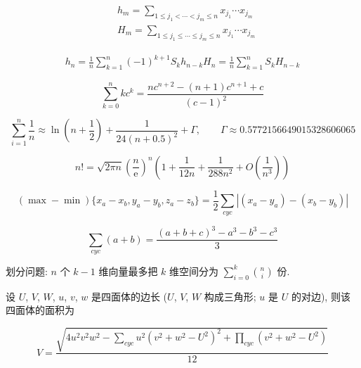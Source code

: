 \begin{eqnarray}
    &h_m = \sum_{1\leq j_1 < \cdots < j_m \leq n} x_{j_1}\cdots x_{j_m}\\
    &H_m = \sum_{1\leq j_1 \leq \cdots \leq j_m \leq n} x_{j_1}\cdots x_{j_m}
\end{eqnarray}

\begin{eqnarray}
    h_n = \frac{1}{n}\sum_{k=1}^n(-1)^{k+1}S_kh_{n-k} 
    H_n = \frac{1}{n}\sum_{k=1}^nS_kH_{n-k} 
\end{eqnarray}

\begin{equation}
    \sum_{k=0}^nkc^k = \frac{nc^{n+2}-(n+1)c^{n+1}+c}{(c-1)^2}
\end{equation}

\begin{equation}
    \sum_{i=1}^n\frac{1}{n}\approx\ln\left(n + \frac 1 2\right) + \frac{1}{24(n+0.5)^2}+\Gamma,\qquad \Gamma\approx0.5772156649015328606065
\end{equation}

\begin{equation}
    n! = \sqrt{2\pi n}\left(\frac{n}{\mathrm{e}}\right)^n\left(1+\frac{1}{12n}+\frac{1}{288n^2}+O\left(\frac{1}{n^3}\right)\right)
\end{equation}

\begin{equation}
    (\max-\min){\{x_a-x_b, y_a-y_b, z_a-z_b\}} = \frac{1}{2}\sum_{cyc}\left| (x_a-y_a)-(x_b-y_b) \right|
\end{equation}

\begin{equation}
    \sum_{cyc}(a+b) = \frac{(a+b+c)^3 - a^3 - b^3 - c^3}{3}
\end{equation}

划分问题: \(n\) 个 \(k-1\) 维向量最多把 \(k\) 维空间分为 \(\sum_{i=0}^{k}\binom{n}{i}\) 份.

设 \(U\), \(V\), \(W\), \(u\), \(v\), \(w\) 是四面体的边长 (\(U\), \(V\), \(W\) 构成三角形; \(u\) 是 \(U\) 的对边), 则该四面体的面积为

\begin{equation}
    V = \frac{\sqrt{ 4u^2v^2w^2 - \sum_{cyc}{u^2(v^2+w^2-U^2)^2} + \prod_{cyc}{(v^2+w^2-U^2)} }}{12}
\end{equation}
